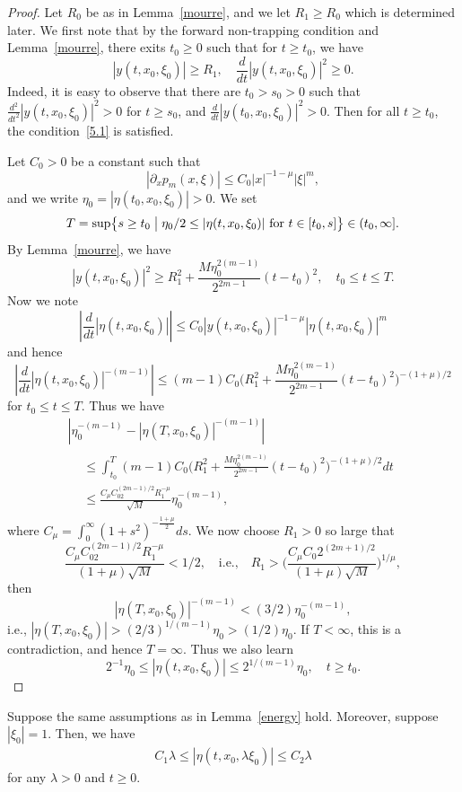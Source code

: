 \documentclass[AHL,Unicode,longabstracts,published]{cedram}
\renewcommand*\l{\lambda}
\newcommand*\m{\mu}
\newcommand*\x{\xi}
\newcommand*\y{\eta}
\newcommand*\pa{\partial}
\newcommand{\biggpare}[1]{\biggl(#1\biggr)}
\newcommand{\bigset}[2]{\bigl\{#1\bigm|#2\bigr\}}
\begin{document}
\begin{proof}
Let $R_0$ be as in Lemma~\ref{mourre}, and we let $R_1\geq R_0$ which is determined later. We first note that by the forward non-trapping condition and Lemma~\ref{mourre}, there exits $t_0\geq 0$ such that for $t\geq t_0$, we have
\begin{equation}\label{5.1}
|y(t,x_0,\x_0)|\geq R_1,\quad \frac{d}{dt}|y(t,x_0,\x_0)|^2\geq 0.
\end{equation}
Indeed, it is easy to observe that there are $t_0>s_0>0$ such that $\frac{d^2}{dt^2}|y(t,x_0,\x_0)|^2>0$ for $t\geq s_0$, and $\frac{d}{dt}|y(t_0,x_0,\x_0)|^2> 0$. Then for all $t\geq t_0$, the condition~\eqref{5.1} is satisfied.

Let $C_0>0$ be a constant such that
\[
\left|\pa_{x}p_m(x,\x)\right|\leq C_0 |x|^{-1-\m} |\x|^{m},
\]
and we write $ \y_0=|\y(t_0,x_0,\x_0)|>0$. We set
\[
T=\sup\bigset{s\geq t_0}{\y_0/2\leq |\y(t,x_0,\x_0)|\text{ for }t\in [t_0,s]}\in (t_0,\infty].
\]
By Lemma~\ref{mourre}, we have
\[
|y(t,x_0,\x_0)|^2\geq R_1^2+\frac{M\y_0^{2(m-1)}}{2^{2m-1}}(t-t_0)^2, \quad t_0\leq t\leq T.
\]
Now we note
\[
\left|\frac{d}{dt}|\y(t,x_0,\x_0)|\right|\leq C_0 |y(t,x_0,\x_0)|^{-1-\m}|\y(t,x_0,\x_0)|^m
\]
and hence
\[
\left|\frac{d}{dt}|\y(t,x_0,\x_0)|^{-(m-1)}\right|
\leq (m-1)C_0 \biggpare{R_1^2+\frac{M\y_0^{2(m-1)}}{2^{2m-1}}(t-t_0)^2}^{-(1+\m)/2}
\]
for $t_0\leq t\leq T$. Thus we have
\begin{multline*}
\left| \y_0^{-(m-1)}-\left|\y(T,x_0,\x_0)\right|^{-(m-1)}\right| \\
\begin{aligned}
&\leq \int_{t_0}^T (m-1)C_0 \biggpare{R_1^2+\frac{M\y_0^{2(m-1)}}{2^{2m-1}}(t-t_0)^2}^{-(1+\m)/2}dt \\
&\leq \frac{C_{\m}C_02^{(2m-1)/2}R_1^{-\m}}{\sqrt{M}}\y_0^{-(m-1)},
\end{aligned}
\end{multline*}
where $C_{\m}=\int_0^{\infty}(1+s^2)^{-\frac{1+\m}{2}}ds$. We now choose $R_1>0$ so large that
\[
\frac{C_{\m}C_02^{(2m-1)/2}R_1^{-\m}}{(1+\m)\sqrt{M}}<1/2,
\quad\text{i.e.,}\quad R_1> \biggpare{\frac{C_{\m}C_0 2^{(2m+1)/2}}{(1+\m)\sqrt{M}}}^{1/\m},
\]
then
\[
\left|\y(T,x_0,\x_0)\right|^{-(m-1)}<(3/2)\y_0^{-(m-1)},
\]
i.e., $|\y(T,x_0,\x_0)|>(2/3)^{1/(m-1)}\y_0>(1/2)\y_0$. If $T<\infty$, this is a contradiction, and hence $T=\infty$. Thus we also learn
\[
2^{-1}\y_0\leq |\y(t,x_0,\x_0)|\leq 2^{1/(m-1)}\y_0, \quad t\geq t_0.
\]
\end{proof}

\begin{coro}
Suppose the same assumptions as in Lemma~\ref{energy} hold. Moreover, suppose $|\x_0|=1$. Then, we have
\begin{align*}
C_1\l\leq |\y(t,x_0,\l\x_0)|\leq C_2\l
\end{align*}
for any $\l>0$ and $t\geq 0$.
\end{coro}
\end{document}
